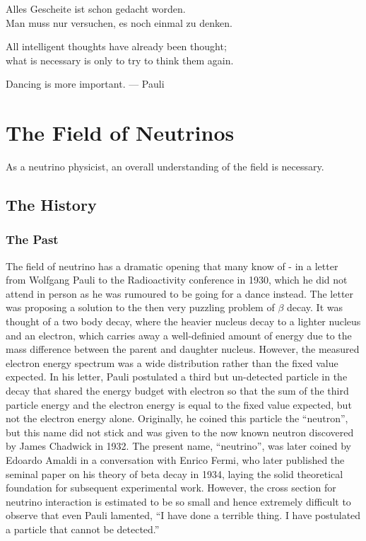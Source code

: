 \begin{savequote}[8cm]
Alles Gescheite ist schon gedacht worden.\\
Man muss nur versuchen, es noch einmal zu denken.

All intelligent thoughts have already been thought;\\
what is necessary is only to try to think them again.

Dancing is more important. --- Pauli
\end{savequote}

\chapter{\label{ch:2-neutrinos}The Field of Neutrinos}
\minitoc

As a neutrino physicist, an overall understanding of the field is necessary.

\section{The History}
\subsection{The Past}
The field of neutrino has a dramatic opening that many know of - in a letter~\cite{Pauli:1930pc} from Wolfgang Pauli to the Radioactivity conference in 1930, which he did not attend in person as he was rumoured to be going for a dance instead. 
The letter was proposing a solution to the then very puzzling problem of $\beta$ decay.
It was thought of a two body decay, where the heavier nucleus decay to a lighter nucleus and an electron, which carries away a well-definied amount of energy due to the mass difference between the parent and daughter nucleus.  
However, the measured electron energy spectrum was a wide distribution rather than the fixed value expected. 
In his letter, Pauli postulated a third but un-detected particle in the decay that shared the energy budget with electron so that the sum of the third particle energy and the electron energy is equal to the fixed value expected, but not the electron energy alone. 
Originally, he coined this particle the ``neutron'', but this name did not stick and was given to the now known neutron discovered by James Chadwick in 1932.
The present name, ``neutrino'', was later coined by Edoardo Amaldi in a conversation with Enrico Fermi, who later published the seminal paper on his theory of beta decay in 1934, laying the solid theoretical foundation for subsequent experimental work.
However, the cross section for neutrino interaction is estimated to be so small and hence extremely difficult to observe that even Pauli lamented, 
``I have done a terrible thing. I have postulated a particle that cannot be detected.''

